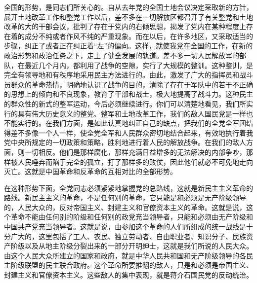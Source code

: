 全国的形势，是同志们所关心的。自从去年党的全国土地会议决定采取新的方针，展开土地改革工作和整党工作以后，差不多在一切解放区都召开了有关整党和土地改革的大的干部会议，批判了存在于党内的右倾思想，揭发了党内在某种程度上存在着的成分不纯或者作风不纯的严重现象。而在以后，在许多地区，又采取适当的步骤，纠正了或者正在纠正着“左”的偏向。这样，就使我党在全国的工作，在新的政治形势和政治任务之下，走上了健全发展的轨道。差不多一切人民解放军的部队，在最近几个月内，都利用了战争的空隙，实行了大规模的整训。这种整训，是完全有领导地和有秩序地采用民主方法进行的。由此，激发了广大的指挥员和战斗员群众的革命热情，明确地认识了战争的目的，清除了存在于军队中的若干不正确的思想上的倾向和不良现象，教育了干部和战士，极大地提高了战斗力。这种民主的群众性的新式的整军运动，今后必须继续进行。你们可以清楚地看见，我们所实行的具有伟大历史意义的整党、整军和土地改革工作，我们的敌人国民党是一样也不能实行的。在我们方面，是如此认真地纠正自己的缺点，把我们的全党全军团结得差不多像一个人一样，使全党全军和人民群众密切地结合起来，有效地执行着我党中央所规定的一切政策和策略，胜利地进行着人民的解放战争。在我们的敌人方面，则一切相反。他们是那样腐化，那样充满日益增多的无法解决的内部争吵，那样被人民唾弃而陷于完全的孤立，打了那样多的败仗，因此他们就必不可免地走向灭亡。这就是中国革命和反革命的互相对比的全部形势。

在这种形势下面，全党同志必须紧紧地掌握党的总路线，这就是新民主主义革命的路线。新民主主义的革命，不是任何别的革命，它只能是和必须是无产阶级领导的，人民大众的，反对帝国主义、封建主义和官僚资本主义的革命。这就是说，这个革命不能由任何别的阶级和任何别的政党充当领导者，只能和必须由无产阶级和中国共产党充当领导者。这就是说，由参加这个革命的人们所组成的统一战线是十分广大的，这里包括了工人、农民、独立劳动者、自由职业者、知识分子、民族资产阶级以及从地主阶级分裂出来的一部分开明绅士，这就是我们所说的人民大众。由这个人民大众所建立的国家和政府，就是中华人民共和国和无产阶级领导的各民主阶级联盟的民主联合政府。这个革命所要推翻的敌人，只是和必须是帝国主义、封建主义和官僚资本主义。这些敌人的集中表现，就是蒋介石国民党的反动统治。


